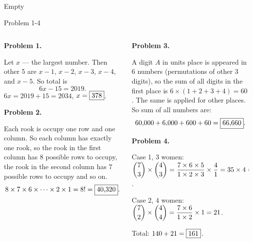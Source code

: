 \documentclass[9pt,aspectratio=169]{beamer}
\begin{document}

\begin{frame}
  Empty
\end{frame}

\begin{frame}{Problem 1-4}
  \begin{columns}[T]
    \begin{column}{0.5\textwidth}
      \textbf{Problem 1.}

      Let $x$ --- the largest number. Then other 5 are $x-1$, $x-2$, $x-3$, $x-4$, and $x-5$. So total is
      \[ 6x - 15 = 2019. \]
      $6x = 2019 + 15 = 2034$, $x = \fbox{378}$.

      \vspace*{\baselineskip}
      \textbf{Problem 2.}

      Each rook is occupy one row and one column. So each column has exactly one rook, so the rook in the first column has $8$ possible rows to occupy, the rook in the second column has $7$ possible rows to occupy and so on.
      \[ 8 \times 7 \times 6 \times \dots \times 2 \times 1 = 8! = \fbox{40{,}320}. \]
    \end{column}
    \begin{column}{0.5\textwidth}
      \textbf{Problem 3.}

      A digit $A$ in units place is appeared in $6$ numbers (permutations of other $3$ digits), so the sum of all digits in the first place is $6 \times (1 + 2 + 3 + 4) = 60$. The same is applied for other places. So sum of all numbers are:
      \[ 60{,}000 + 6{,}000 + 600 + 60 = \fbox{66{,}660}. \]
      
      \vspace*{\baselineskip}
      \textbf{Problem 4.}

      Case 1, $3$ women: $\dbinom{7}{3} \times \dbinom{4}{3} = \dfrac{7 \times 6 \times 5}{1 \times 2 \times 3} \times \dfrac{4}{1} = 35 \times 4 = 140$. 

      Case 2, $4$ women: $\dbinom{7}{2} \times \dbinom{4}{4} = \dfrac{7 \times 6}{1 \times 2} \times 1 = 21$.

      Total: $140 + 21 = \fbox{161}$.
    \end{column}
  \end{columns}
\end{frame}
\end{document}
